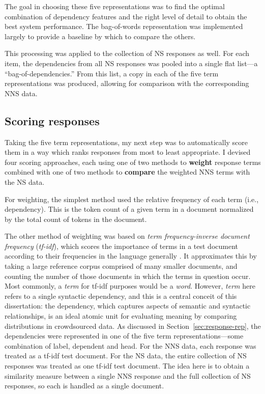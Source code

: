 The goal in choosing these five representations was to find the optimal combination of dependency features and the right level of detail to obtain the best system performance. The bag-of-words representation was implemented largely to provide a baseline by which to compare the others.

This processing was applied to the collection of NS responses as well. For each item, the dependencies from all NS responses was pooled into a single flat list---a ``bag-of-dependencies.'' From this list, a copy in each of the five term representations was produced, allowing for comparison with the corresponding NNS data.


\subsection{Scoring responses}
\label{sec:scoring}

Taking the five term representations, my next step was to automatically score them in a way which ranks responses from most to least appropriate.  I devised four scoring approaches, each using one of two methods to \textbf{weight} response terms combined with one of two methods to \textbf{compare} the weighted NNS terms with the NS data.

For weighting, the simplest method used the relative frequency of each term (i.e., dependency). This is the token count of a given term in a document normalized by the total count of tokens in the document.

The other method of weighting was based on \textit{term frequency-inverse document frequency} (\textit{tf-idf}), which scores the importance of terms in a test document according to their frequencies in the language generally \citep[][ch. 6]{manning-et-al:08}. It approximates this by taking a large reference corpus comprised of many smaller documents, and counting the number of those documents in which the terms in question occur. Most commonly, a \textit{term} for tf-idf purposes would be a \textit{word}. However, \textit{term} here refers to a single syntactic dependency, and this is a central conceit of this dissertation:  the dependency, which captures aspects of semantic and syntactic relationships, is an ideal atomic unit for evaluating meaning by comparing distributions in crowdsourced data. As discussed in Section~\ref{sec:response-rep}, the dependencies were represented in one of the five term representations---some combination of label, dependent and head. For the NNS data, each response was treated as a tf-idf test document. For the NS data, the entire collection of NS responses was treated as one tf-idf test document. The idea here is to obtain a similarity measure between a single NNS response and the full collection of NS responses, so each is handled as a single document.

